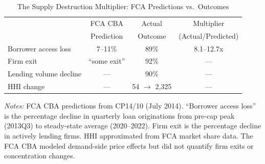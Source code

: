 \begin{table}[t]
\centering
\begin{threeparttable}
\caption{The Supply Destruction Multiplier: FCA Predictions vs.~Outcomes}
\label{tab:multiplier}
\begin{tabular}{lccc}
\toprule
 & FCA CBA & Actual & Multiplier \\
 & Prediction & Outcome & (Actual/Predicted) \\
\midrule
Borrower access loss & 7--11\% & 89\% & 8.1--12.7x \\
Firm exit & ``some exit'' & 92\% & --- \\
Lending volume decline & --- & 90\% & --- \\
HHI change & --- & 54 $\rightarrow$ 2,325 & --- \\
\bottomrule
\end{tabular}
\begin{tablenotes}\small
\item \textit{Notes:} FCA CBA predictions from CP14/10 (July 2014). ``Borrower access loss'' is the percentage decline in quarterly loan originations from pre-cap peak (2013Q3) to steady-state average (2020--2022). Firm exit is the percentage decline in actively lending firms. HHI approximated from FCA market share data. The FCA CBA modeled demand-side price effects but did not quantify firm exits or concentration changes.
\end{tablenotes}
\end{threeparttable}
\end{table}
